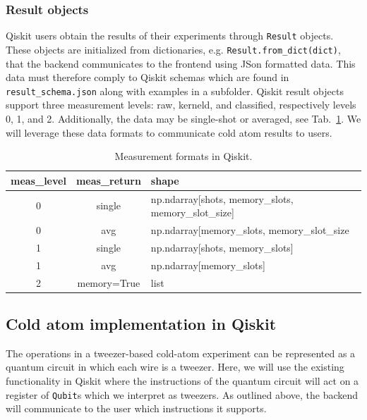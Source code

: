\documentclass[a4paper, 10pt]{article}
\begin{document}
    
\subsubsection{Result objects\label{sec:qiskit_results}}
    
Qiskit users obtain the results of their experiments through \texttt{Result} objects.
These objects are initialized from dictionaries, e.g. \texttt{Result.from\_dict(dict)}, that the backend communicates to the frontend using JSon formatted data.
This data must therefore comply to Qiskit schemas which are found in \texttt{result\_schema.json} along with examples in a subfolder.
Qiskit result objects support three measurement levels: raw, kerneld, and classified, respectively levels 0, 1, and 2.
Additionally, the data may be single-shot or averaged, see Tab.~\ref{tab:meas_formats}.
We will leverage these data formats to communicate cold atom results to users.
    
\begin{table}[htbp]
    \centering
    \begin{tabular}{c c l}\hline
            meas\_level &  meas\_return & shape \\ \hline
            0 & single & np.ndarray[shots, memory\_slots, memory\_slot\_size] \\
            0 & avg &         np.ndarray[memory\_slots, memory\_slot\_size \\
            1 & single & np.ndarray[shots, memory\_slots] \\
            1 & avg & np.ndarray[memory\_slots] \\
            2 & memory=True & list \\ \hline
    \end{tabular}
    \caption{Measurement formats in Qiskit.}
    \label{tab:meas_formats}
\end{table}
    
\subsection{Cold atom implementation in Qiskit}

The operations in a tweezer-based cold-atom experiment can be represented as a quantum circuit in which each wire is a tweezer.
Here, we will use the existing functionality in Qiskit where the instructions of the quantum circuit will act on a register of \texttt{Qubit}s which we interpret as tweezers.
As outlined above, the backend will communicate to the user which instructions it supports.
    
\end{document}
